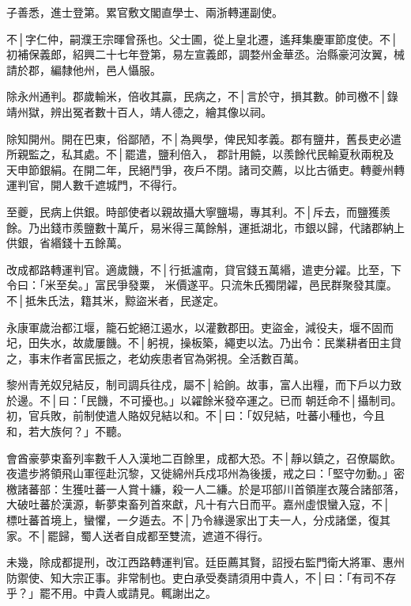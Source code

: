\begin{pinyinscope}
 子善悉，進士登第。累官敷文閣直學士、兩浙轉運副使。



 不│字仁仲，嗣濮王宗暉曾孫也。父士圃，從上皇北遷，遙拜集慶軍節度使。不│初補保義郎，紹興二十七年登第，易左宣義郎，調婺州金華丞。治縣豪河汝翼，械請於郡，編隸他州，邑人懾服。



 除永州通判。郡歲輸米，倍收其贏，民病之，不│言於守，損其數。帥司檄不│錄靖州獄，辨出冤者數十百人，靖人德之，繪其像以祠。



 除知開州。開在巴東，俗鄙陋，不│為興學，俾民知孝義。郡有鹽井，舊長吏必遣所親監之，私其處。不│罷遣，鹽利倍入，
 郡計用饒，以羨餘代民輸夏秋兩稅及天申節銀絹。在開二年，民絕鬥爭，夜戶不閉。諸司交薦，以比古循吏。轉夔州轉運判官，開人數千遮城門，不得行。



 至夔，民病上供銀。時部使者以親故攝大寧鹽場，專其利。不│斥去，而鹽獲羨餘。乃出錢市羨鹽數十萬斤，易米得三萬餘斛，運抵湖北，市銀以歸，代諸郡納上供銀，省緡錢十五餘萬。



 改成都路轉運判官。適歲饑，不│行抵瀘南，貸官錢五萬緡，遣吏分糴。比至，下令曰：「米至矣。」富民爭發粟，
 米價遂平。只流朱氏獨閉糴，邑民群聚發其廩。不│抵朱氏法，籍其米，黥盜米者，民遂定。



 永康軍歲治都江堰，籠石蛇絕江遏水，以灌數郡田。吏盜金，減役夫，堰不固而圮，田失水，故歲屢饑。不│躬視，操板築，繩吏以法。乃出令：民業耕者田主貸之，事末作者富民振之，老幼疾患者官為粥視。全活數百萬。



 黎州青羌奴兒結反，制司調兵往戍，屬不│給餉。故事，富人出糧，而下戶以力致於邊。不│曰：「民饑，不可擾也。」以糴餘米發卒運之。已而
 朝廷命不│攝制司。初，官兵敗，前制使遣人賂奴兒結以和。不│曰：「奴兒結，吐蕃小種也，今且和，若大族何？」不聽。



 會酋豪夢束畜列率數千人入漢地二百餘里，成都大恐。不│靜以鎮之，召僚屬飲。夜遣步將領飛山軍徑赴沉黎，又徙綿州兵戍邛州為後援，戒之曰：「堅守勿動。」密檄諸蕃部：生獲吐蕃一人賞十縑，殺一人二縑。於是邛部川首領崖衣蔑合諸部落，大破吐蕃於漢源，斬夢束畜列首來獻，凡十有六日而平。嘉州虛恨蠻入寇，不│
 標吐蕃首境上，蠻懼，一夕遁去。不│乃令緣邊家出丁夫一人，分戍諸堡，復其家。不│罷歸，蜀人送者自成都至雙流，遮道不得行。



 未幾，除成都提刑，改江西路轉運判官。廷臣薦其賢，詔授右監門衛大將軍、惠州防禦使、知大宗正事。非常制也。吏白承受奏請須用中貴人，不│曰：「有司不存乎？」罷不用。中貴人或請見。輒謝出之。




\end{pinyinscope}
